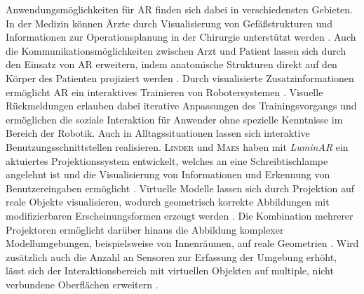Anwendungsmöglichkeiten für AR finden sich dabei in verschiedensten Gebieten. In der Medizin können Ärzte durch Visualisierung von Gefäßstrukturen und Informationen zur Operationsplanung in der Chirurgie unterstützt werden \cite{Nicolau2011}. Auch die Kommunikationsmöglichkeiten zwischen Arzt und Patient lassen sich durch den Einsatz von AR erweitern, indem anatomische Strukturen direkt auf den Körper des Patienten projiziert werden \cite{Bluteau2005}. Durch visualisierte Zusatzinformationen ermöglicht AR ein interaktives Trainieren von Robotersystemen \cite{DeTommaso2012}. Visuelle Rückmeldungen erlauben dabei iterative Anpassungen des Trainingsvorgangs und ermöglichen die soziale Interaktion für Anwender ohne spezielle Kenntnisse im Bereich der Robotik. Auch in Alltagssituationen lassen sich interaktive Benutzungsschnittstellen realisieren. \textsc{Linder} und \textsc{Maes} haben mit \textit{LuminAR} ein aktuiertes Projektionssystem entwickelt, welches an eine Schreibtischlampe angelehnt ist und die Visualisierung von Informationen und Erkennung von Benutzereingaben ermöglicht \cite{Linder2010}. Virtuelle Modelle lassen sich durch Projektion auf reale Objekte visualisieren, wodurch geometrisch korrekte Abbildungen mit modifizierbaren Erscheinungsformen erzeugt werden \cite{Raskar1999}. Die Kombination mehrerer Projektoren ermöglicht darüber hinaus die Abbildung komplexer Modellumgebungen, beispielsweise von Innenräumen, auf reale Geometrien \cite{Low2001}. Wird zusätzlich auch die Anzahl an Sensoren zur Erfassung der Umgebung erhöht, lässt sich der Interaktionsbereich mit virtuellen Objekten auf multiple, nicht verbundene Oberflächen erweitern \cite{Wilson2010}.\\




